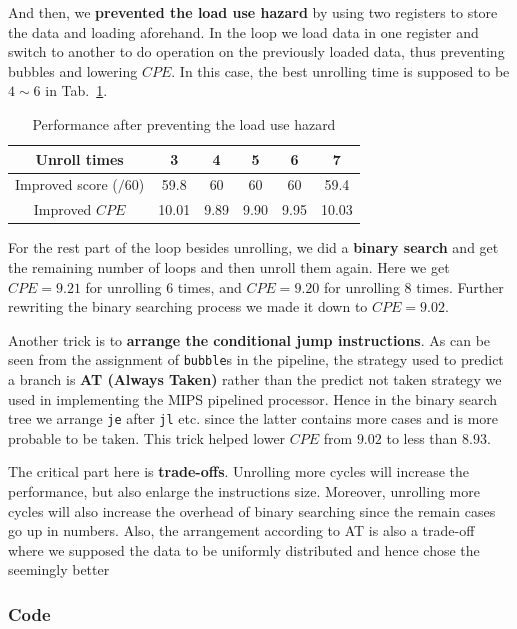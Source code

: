 \documentclass{article}
\begin{document}
\par And then, we \textbf{prevented the load use hazard} by using two registers to store the data and loading aforehand. In the loop we load data in one register and switch to another to do operation on the previously loaded data, thus preventing bubbles and lowering $CPE$. In this case, the best unrolling time is supposed to be $4\sim 6$ in Tab.~\ref{tab:hazard_res}.
\begin{table}[h]
    \centering
    \begin{tabular}{c|ccccc}
         Unroll times & 3 & 4 & 5 & 6 & 7 \\
         \hline
         Improved score ($/60$)& 59.8 & 60 & 60 & 60 & 59.4\\
         Improved $CPE$& 10.01 & 9.89 & 9.90 & 9.95 & 10.03
    \end{tabular}
    \caption{Performance after preventing the load use hazard}
    \label{tab:hazard_res}
\end{table}
\par For the rest part of the loop besides unrolling, we did a \textbf{binary search} and get the remaining number of loops and then unroll them again. Here we get $CPE=9.21$ for unrolling 6 times, and $CPE=9.20$ for unrolling 8 times. Further rewriting the binary searching process we made it down to $CPE=9.02$.
\par Another trick is to \textbf{arrange the conditional jump instructions}. As can be seen from the assignment of \lstinline{bubble}s in the pipeline, the strategy used to predict a branch is \textbf{AT (Always Taken)} rather than the predict not taken strategy we used in implementing the MIPS pipelined processor. Hence in the binary search tree we arrange \lstinline{je} after \lstinline{jl} etc. since the latter contains more cases and is more probable to be taken. This trick helped lower $CPE$ from $9.02$ to less than $8.93$.
\par The critical part here is \textbf{trade-offs}. Unrolling more cycles will increase the performance, but also enlarge the instructions size. Moreover, unrolling more cycles will also increase the overhead of binary searching since the remain cases go up in numbers. Also, the arrangement according to AT is also a trade-off where we supposed the data to be uniformly distributed and hence chose the seemingly better 

\subsubsection{Code}
\end{document}
